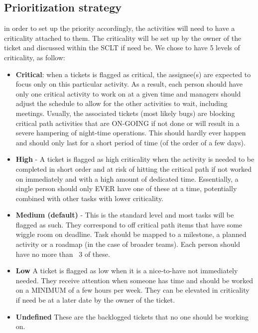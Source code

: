 \documentclass[SE,authoryear,toc]{lsstdoc}
\begin{document}
\subsection{Prioritization strategy}
in order to set up the priority accordingly, the activities will need to have a criticality attached to them.  The criticality will be set up by the owner of the ticket and discussed within the SCLT if need be.  We chose to have 5 levels of criticality, as follow:
\begin{itemize}
\item{\bf Critical}: when a tickets is flagged as critical, the assignee(s) are expected to focus only on this particular activity. As a result, each person should have only one critical activity to work on at a given time and managers should adjust the schedule to allow for the other activities to wait, including meetings. 
Usually, the associated tickets (most likely bugs) are blocking critical path activities that are ON-GOING if not done or will result in a severe hampering of night-time operations. This should hardly ever happen and should only last for a short period of time (of the order of a few days). 

\item{\bf High} - A ticket is flagged as high criticality when the activity is needed to be completed in short order and at risk of hitting the critical path if not worked on immediately and with a high amount of dedicated time. Essentially, a single person should only EVER have one of these at a time, potentially combined with other tasks with lower criticality. 

\item{\bf Medium (default)} - This is the standard level and most tasks will be flagged as such. They correspond to off critical path items that have some wiggle room on deadline. Task should be mapped to a milestone, a planned activity or a roadmap (in the case of broader teams).  
Each person should have no more than ~3 of these.

\item{\bf Low} A ticket is flagged as low when it is a nice-to-have not immediately needed. They receive attention when someone has time and  should be worked on a MINIMUM of a few hours per week. They can be elevated in criticality if need be at a later date by the owner of the ticket.  

\item{\bf Undefined} These are the backlogged tickets that no one should be working on.
\end{itemize}
\end{document}
